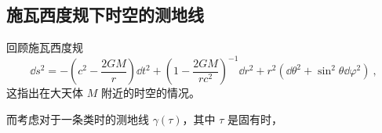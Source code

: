 
\subsection{施瓦西度规下时空的测地线}
回顾施瓦西度规
\begin{equation}
\dd  s^2 = -\left(c^2 - \frac{2GM}{r}\right) \dd t^2+ \left(1-\frac{2GM}{r c^2}\right)^{-1}\dd r^2 + r^2(\dd \theta^2 + \sin^2 \theta \dd \varphi^2) ~,
\end{equation}
这指出在大天体 $M$ 附近的时空的情况。

而考虑对于一条类时的测地线 $\gamma(\tau)$，其中 $\tau$ 是固有时，